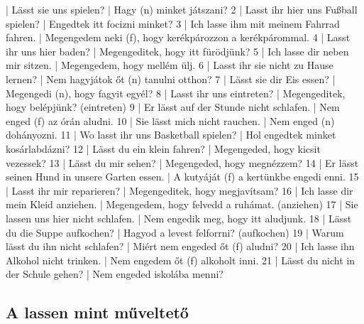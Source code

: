 \documentclass{article}
\newenvironment{exmp}{\verbatim}{\endverbatim}
\begin{document}
\begin{exmp}
1 | Lässt sie uns spielen? | Hagy (n) minket játszani?
2 | Lasst ihr hier uns Fußball spielen? | Engedtek itt focizni minket?
3 | Ich lasse ihm mit meinem Fahrrad fahren. | Megengedem neki (f), hogy kerékpározzon a kerékpárommal.
4 | Lasst ihr uns hier baden? | Megengeditek, hogy itt fürödjünk?
5 | Ich lasse dir neben mir sitzen. | Megengedem, hogy mellém ülj.
6 | Lasst ihr sie nicht zu Hause lernen? | Nem hagyjátok őt (n) tanulni otthon?
7 | Lässt sie dir Eis essen? | Megengedi (n), hogy fagyit egyél?
8 | Lasst ihr uns eintreten? | Megengeditek, hogy belépjünk? (eintreten)
9 | Er lässt auf der Stunde nicht schlafen. | Nem enged (f) az órán aludni.
10 | Sie lässt mich nicht rauchen. | Nem enged (n) dohányozni.
11 | Wo lasst ihr uns Basketball spielen? | Hol engedtek minket kosárlabdázni?
12 | Lässt du ein klein fahren? | Megengeded, hogy kicsit vezessek?
13 | Lässt du mir sehen? | Megengeded, hogy megnézzem?
14 | Er lässt seinen Hund in unsere Garten essen. | A kutyáját (f) a kertünkbe engedi enni.
15 | Lasst ihr mir reparieren? | Megengeditek, hogy megjavítsam?
16 | Ich lasse dir mein Kleid anziehen. | Megengedem, hogy felvedd a ruhámat. (anziehen)
17 | Sie lassen uns hier nicht schlafen. | Nem engedik meg, hogy itt aludjunk.
18 | Lässt du die Suppe aufkochen? | Hagyod a levest felforrni? (aufkochen)
19 | Warum lässt du ihn nicht schlafen? | Miért nem engeded őt (f) aludni?
20 | Ich lasse ihn Alkohol nicht trinken. | Nem engedem őt (f) alkoholt inni.
21 | Lässt du nicht in der Schule gehen? | Nem engeded iskolába menni?
\end{exmp}

\subsection{A lassen mint műveltető}
\end{document}
